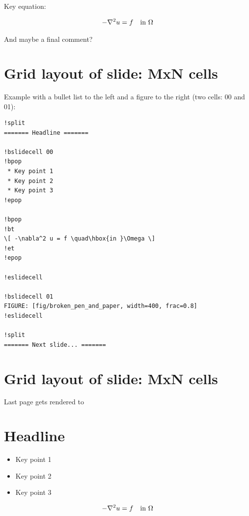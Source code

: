 \documentclass[%
twoside,                 %
final,                   %
chapterprefix=true,      %
open=right               %
10pt]{book}
\begin{document}
Key equation:

\[ -\nabla^2 u = f \quad\hbox{in }\Omega \]

And maybe a final comment?

\section*{Grid layout of slide: MxN cells}

Example with a bullet list to the left and
a figure to the right (two cells: 00 and 01):

\begin{Verbatim}[numbers=none,fontsize=\fontsize{9pt}{9pt},baselinestretch=0.95]
!split
======= Headline =======

!bslidecell 00
!bpop
 * Key point 1
 * Key point 2
 * Key point 3
!epop

!bpop
!bt
\[ -\nabla^2 u = f \quad\hbox{in }\Omega \]
!et
!epop

!eslidecell

!bslidecell 01
FIGURE: [fig/broken_pen_and_paper, width=400, frac=0.8]
!eslidecell

!split
======= Next slide... =======
\end{Verbatim}

\section*{Grid layout of slide: MxN cells}

Last page gets rendered to




\section*{Headline}

\begin{itemize}
 \item Key point 1

 \item Key point 2

 \item Key point 3
\end{itemize}

\noindent

\[ -\nabla^2 u = f \quad\hbox{in }\Omega \]


\end{document}
